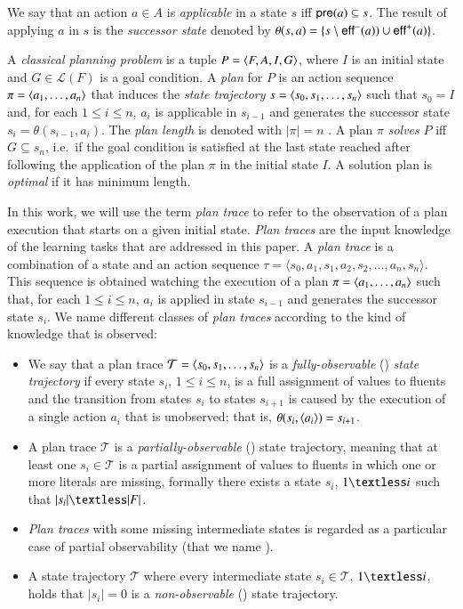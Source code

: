 We say that an action $a\in A$ is {\em applicable} in a state $s$ iff $\mathsf{pre}(a)\subseteq s$. The result of applying $a$ in $s$ is the {\em successor state} denoted by $\theta(s,a)=\{s\setminus\mathsf{eff}^-(a))\cup\mathsf{eff}^+(a)\}$.

A {\em classical planning problem} is a tuple $P={\langle F,A,I,G \rangle}$, where $I$ is an initial state and $G\in\mathcal{L}(F)$ is a goal condition. A {\em plan} for $P$ is an action sequence $\pi={\langle a_1, \ldots, a_n \rangle}$ that induces the {\em state trajectory} $s={\langle s_0, s_1, \ldots, s_n \rangle}$ such that $s_0=I$ and, for each {\small $1\leq i\leq n$}, $a_i$ is applicable in $s_{i-1}$ and generates the successor state $s_i=\theta(s_{i-1},a_i)$. The {\em plan length} is denoted with $|\pi|=n$ . A plan $\pi$ {\em solves} $P$ iff $G\subseteq s_n$, i.e.~if the goal condition is satisfied at the last state reached after following the application of the plan $\pi$ in the initial state $I$. A solution plan is {\em optimal} if it has minimum length.

In this work, we will use the term \emph{plan trace} to refer to the observation of a plan execution that starts on a given initial state. \emph{Plan traces} are the input knowledge of the learning tasks that are addressed in this paper. A \emph{plan trace} is a combination of a state and an action sequence $\tau = \langle s_0, a_1, s_1, a_2, s_2, \ldots, a_n, s_n \rangle$. This sequence is obtained watching the execution of a plan $\pi={\langle a_1, \ldots, a_n \rangle}$ such that, for each {\small $1\leq i\leq n$}, $a_i$ is applied in state $s_{i-1}$ and generates the successor state $s_i$. We name different classes of \emph{plan traces} according to the kind of knowledge that is observed:
\begin{itemize}
  \item[{\bf\FO}] We say that a plan trace $\mathcal{T}={\langle s_0, s_1, \ldots, s_n \rangle}$ is a {\em fully-observable} (\FO) {\em state trajectory} if every state $s_i$, {\small $1\leq i\leq n$}, is a full assignment of values to fluents and the transition from states $s_i$ to states $s_{i+1}$ is caused by the execution of a single action $a_i$ that is unobserved; that is, $\theta(s_i,{\langle a_i \rangle})=s_{i+1}$. 
  \item[{\bf\PO}] A plan trace $\mathcal{T}$ is a {\em partially-observable} (\PO) state trajectory, meaning that at least one $s_i\in\mathcal{T}$ is a partial assignment of values to fluents in which one or more literals are missing, formally there exists a state $s_i$, {\small $1\textless i$} such that $|s_i|\textless|F|$. 
  \item[{\bf\POstar}] \emph{Plan traces} with some missing intermediate states is regarded as a particular case of partial observability (that we name \POstar). 
  \item[{\bf\NO}]A state trajectory $\mathcal{T}$ where every intermediate state $s_i\in\mathcal{T}$, {\small $1\textless i$}, holds that $|s_i|=0$ is a \emph{non-observable} (\NO) state trajectory.
\end{itemize}  

